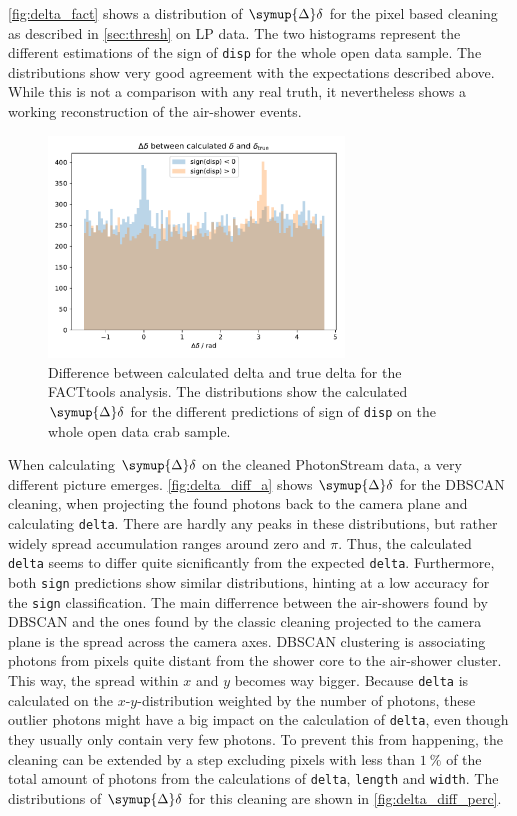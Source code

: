 \autoref{fig:delta_fact} shows a distribution of $\symup{\Delta}\delta$ for
the pixel based cleaning as described in \autoref{sec:thresh} on LP data.
The two histograms represent the different estimations of the sign of
\texttt{disp} for the whole open data sample. The distributions show very
good agreement with the expectations described above. While this is not a
comparison with any real truth, it nevertheless shows a working
reconstruction of the air-shower events.
%
\begin{figure}
  \centering
  \includegraphics[width=0.7\textwidth]{Plots/delta_delta/delta_delta_facttools.pdf}
  \caption{Difference between calculated delta and true delta for the FACTtools analysis. The distributions show the calculated $\symup{\Delta}\delta$ for the different predictions of sign of \texttt{disp} on the whole open data crab sample.}
  \label{fig:delta_fact}
\end{figure}
%
When calculating $\symup{\Delta}\delta$ on the cleaned PhotonStream data, a
very different picture emerges. \autoref{fig:delta_diff_a} shows
$\symup{\Delta}\delta$ for the DBSCAN cleaning, when projecting the found
photons back to the camera plane and calculating \texttt{delta}. There are
hardly any peaks in these distributions, but rather widely spread
accumulation ranges around zero and $\pi$. Thus, the calculated
\texttt{delta} seems to differ quite sicnificantly from the expected
\texttt{delta}. Furthermore, both \texttt{sign} predictions show similar
distributions, hinting at a low accuracy for the \texttt{sign}
classification. The main differrence between the air-showers found by DBSCAN
and the ones found by the classic cleaning projected to the camera plane is
the spread across the camera axes. DBSCAN clustering is associating photons
from pixels quite distant from the shower core to the air-shower cluster.
This way, the spread within $x$ and $y$ becomes way bigger. Because
\texttt{delta} is calculated on the $x$-$y$-distribution weighted by the
number of photons, these outlier photons might have a big impact on the
calculation of \texttt{delta}, even though they usually only contain very
few photons. To prevent this from happening, the cleaning can be extended by
a step excluding pixels with less than $\SI{1}{\percent}$ of the total
amount of photons from the calculations of \texttt{delta}, \texttt{length}
and \texttt{width}. The distributions of $\symup{\Delta}\delta$ for this
cleaning are shown in \autoref{fig:delta_diff_perc}.

